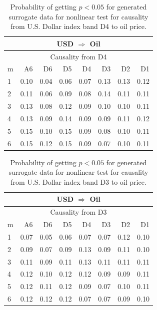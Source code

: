 %
%
\begin{table}[H]
\begin{center}
\begin{tabular}{l|r r r r r r r}
\hline\hline
\multicolumn{8}{c}{USD $\Rightarrow$ Oil}\\
\hline
\multicolumn{8}{c}{Causality from D4}\\
\hline\hline
m & A6 & D6 & D5 & D4 & D3 & D2 & D1 \\
\hline
1 & 0.10 & 0.04 & 0.06 & 0.07 & 0.13 & 0.13 & 0.12 \\
2 & 0.11 & 0.06 & 0.09 & 0.08 & 0.14 & 0.11 & 0.11 \\
3 & 0.13 & 0.08 & 0.12 & 0.09 & 0.10 & 0.10 & 0.11 \\
4 & 0.13 & 0.09 & 0.14 & 0.09 & 0.09 & 0.11 & 0.12 \\
5 & 0.15 & 0.10 & 0.15 & 0.09 & 0.08 & 0.10 & 0.11 \\
6 & 0.15 & 0.12 & 0.15 & 0.09 & 0.07 & 0.10 & 0.11 \\
\hline\hline
\end{tabular}
\caption{Probability of getting $p < 0.05$ for generated surrogate data for nonlinear test for causality from U.S. Dollar index band D4 to oil price.}
\end{center}
\end{table}

%
%
\begin{table}[H]
\begin{center}
\begin{tabular}{l|r r r r r r r}
\hline\hline
\multicolumn{8}{c}{USD $\Rightarrow$ Oil}\\
\hline
\multicolumn{8}{c}{Causality from D3}\\
\hline\hline
m & A6 & D6 & D5 & D4 & D3 & D2 & D1 \\
\hline
1 & 0.07 & 0.05 & 0.06 & 0.07 & 0.07 & 0.12 & 0.10 \\
2 & 0.09 & 0.07 & 0.09 & 0.13 & 0.09 & 0.11 & 0.10 \\
3 & 0.11 & 0.09 & 0.11 & 0.13 & 0.11 & 0.11 & 0.11 \\
4 & 0.12 & 0.10 & 0.12 & 0.12 & 0.09 & 0.09 & 0.11 \\
5 & 0.12 & 0.11 & 0.12 & 0.09 & 0.07 & 0.10 & 0.11 \\
6 & 0.12 & 0.12 & 0.12 & 0.07 & 0.07 & 0.09 & 0.10 \\
\hline\hline
\end{tabular}
\caption{Probability of getting $p < 0.05$ for generated surrogate data for nonlinear test for causality from U.S. Dollar index band D3 to oil price.}
\end{center}
\end{table}

